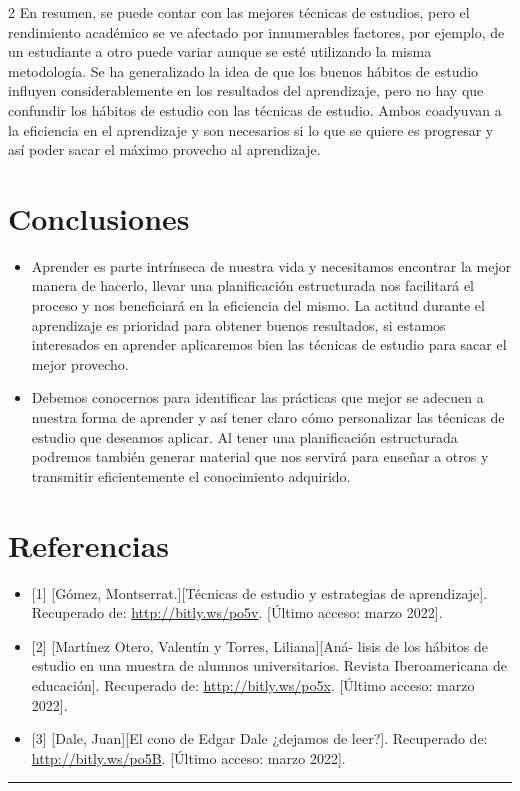 \documentclass[12pt,spanish,Letterpaper,openany]{book}
\newcommand{\HRule}{\begin{center}\rule{0.5\linewidth}{0.2mm}\end{center}}
\begin{document}
\begin {multicols}{2}
En resumen, se puede contar con las mejores técnicas de estudios, pero el rendimiento académico se ve afectado por innumerables factores, por ejemplo, de un estudiante a otro puede variar aunque se esté utilizando la misma metodología. Se ha generalizado la idea de que los buenos hábitos de estudio influyen considerablemente en los resultados del aprendizaje, pero no hay que confundir los hábitos de estudio con las técnicas de estudio. Ambos coadyuvan a la eficiencia en el aprendizaje y son necesarios si lo que se quiere es progresar y así poder sacar el máximo provecho al aprendizaje.

\hypertarget{conclusiones-3}{%
\section{Conclusiones}\label{conclusiones-3}}

\begin{itemize}
\item
  Aprender es parte intrínseca de nuestra vida y necesitamos encontrar la mejor manera de hacerlo, llevar una planificación estructurada nos facilitará el proceso y nos beneficiará en la eficiencia del mismo. La actitud durante el aprendizaje es prioridad para obtener buenos resultados, si estamos interesados en aprender aplicaremos bien las técnicas de estudio para sacar el mejor provecho.
\item
  Debemos conocernos para identificar las prácticas que mejor se adecuen a nuestra forma de aprender y así tener claro cómo personalizar las técnicas de estudio que deseamos aplicar. Al tener una planificación estructurada podremos también generar material que nos servirá para enseñar a otros y transmitir eficientemente el conocimiento adquirido.
\end{itemize}

\hypertarget{referencias-6}{%
\section*{Referencias}\label{referencias-6}}

\begin{itemize}
\item
  {[}1{]} {[}Gómez, Montserrat.{]}{[}Técnicas de estudio y estrategias de aprendizaje{]}. Recuperado de: \url{http://bitly.ws/po5v}. {[}Último acceso: marzo 2022{]}.
\item
  {[}2{]} {[}Martínez Otero, Valentín y Torres, Liliana{]}{[}Aná-
  lisis de los hábitos de estudio en una muestra de alumnos universitarios. Revista Iberoamericana de educación{]}. Recuperado de: \url{http://bitly.ws/po5x}. {[}Último acceso: marzo 2022{]}.
\item
  {[}3{]} {[}Dale, Juan{]}{[}El cono de Edgar Dale ¿dejamos de leer?{]}. Recuperado de: \url{http://bitly.ws/po5B}. {[}Último acceso: marzo 2022{]}.
\end{itemize}

\end {multicols}
\medskip
\HRule
\medskip
\end{document}
